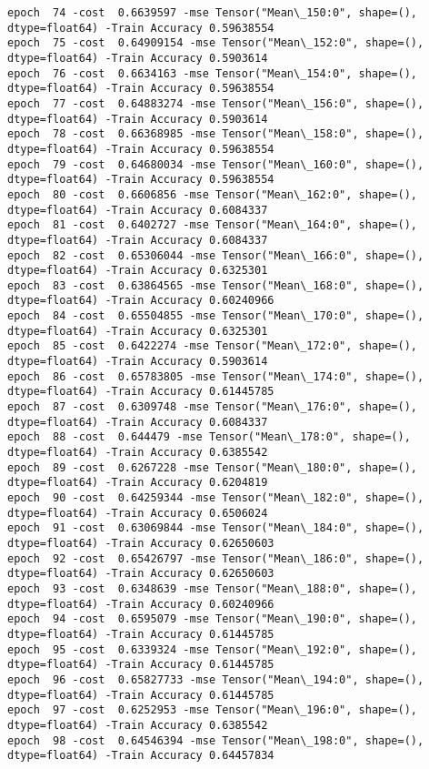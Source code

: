 \documentclass[11pt]{article}
\begin{document}
\begin{Verbatim}[commandchars=\\\{\}]
epoch  74 -cost  0.6639597 -mse Tensor("Mean\_150:0", shape=(), dtype=float64) -Train Accuracy 0.59638554
epoch  75 -cost  0.64909154 -mse Tensor("Mean\_152:0", shape=(), dtype=float64) -Train Accuracy 0.5903614
epoch  76 -cost  0.6634163 -mse Tensor("Mean\_154:0", shape=(), dtype=float64) -Train Accuracy 0.59638554
epoch  77 -cost  0.64883274 -mse Tensor("Mean\_156:0", shape=(), dtype=float64) -Train Accuracy 0.5903614
epoch  78 -cost  0.66368985 -mse Tensor("Mean\_158:0", shape=(), dtype=float64) -Train Accuracy 0.59638554
epoch  79 -cost  0.64680034 -mse Tensor("Mean\_160:0", shape=(), dtype=float64) -Train Accuracy 0.59638554
epoch  80 -cost  0.6606856 -mse Tensor("Mean\_162:0", shape=(), dtype=float64) -Train Accuracy 0.6084337
epoch  81 -cost  0.6402727 -mse Tensor("Mean\_164:0", shape=(), dtype=float64) -Train Accuracy 0.6084337
epoch  82 -cost  0.65306044 -mse Tensor("Mean\_166:0", shape=(), dtype=float64) -Train Accuracy 0.6325301
epoch  83 -cost  0.63864565 -mse Tensor("Mean\_168:0", shape=(), dtype=float64) -Train Accuracy 0.60240966
epoch  84 -cost  0.65504855 -mse Tensor("Mean\_170:0", shape=(), dtype=float64) -Train Accuracy 0.6325301
epoch  85 -cost  0.6422274 -mse Tensor("Mean\_172:0", shape=(), dtype=float64) -Train Accuracy 0.5903614
epoch  86 -cost  0.65783805 -mse Tensor("Mean\_174:0", shape=(), dtype=float64) -Train Accuracy 0.61445785
epoch  87 -cost  0.6309748 -mse Tensor("Mean\_176:0", shape=(), dtype=float64) -Train Accuracy 0.6084337
epoch  88 -cost  0.644479 -mse Tensor("Mean\_178:0", shape=(), dtype=float64) -Train Accuracy 0.6385542
epoch  89 -cost  0.6267228 -mse Tensor("Mean\_180:0", shape=(), dtype=float64) -Train Accuracy 0.6204819
epoch  90 -cost  0.64259344 -mse Tensor("Mean\_182:0", shape=(), dtype=float64) -Train Accuracy 0.6506024
epoch  91 -cost  0.63069844 -mse Tensor("Mean\_184:0", shape=(), dtype=float64) -Train Accuracy 0.62650603
epoch  92 -cost  0.65426797 -mse Tensor("Mean\_186:0", shape=(), dtype=float64) -Train Accuracy 0.62650603
epoch  93 -cost  0.6348639 -mse Tensor("Mean\_188:0", shape=(), dtype=float64) -Train Accuracy 0.60240966
epoch  94 -cost  0.6595079 -mse Tensor("Mean\_190:0", shape=(), dtype=float64) -Train Accuracy 0.61445785
epoch  95 -cost  0.6339324 -mse Tensor("Mean\_192:0", shape=(), dtype=float64) -Train Accuracy 0.61445785
epoch  96 -cost  0.65827733 -mse Tensor("Mean\_194:0", shape=(), dtype=float64) -Train Accuracy 0.61445785
epoch  97 -cost  0.6252953 -mse Tensor("Mean\_196:0", shape=(), dtype=float64) -Train Accuracy 0.6385542
epoch  98 -cost  0.64546394 -mse Tensor("Mean\_198:0", shape=(), dtype=float64) -Train Accuracy 0.64457834

\end{Verbatim}
\end{document}
